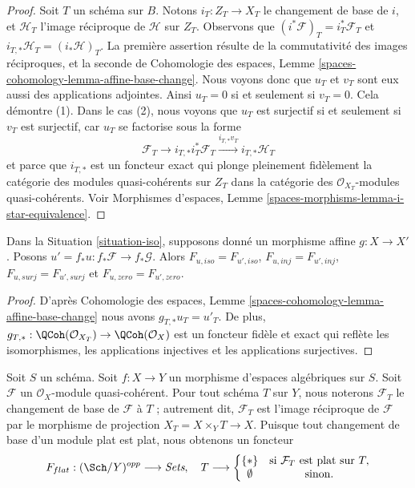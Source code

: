 \begin{proof}
Soit $T$ un schéma sur $B$. Notons $i_T : Z_T \to X_T$
le changement de base de $i$, et $\mathcal{H}_T$ l'image réciproque de $\mathcal{H}$
sur $Z_T$. Observons que $(i^*\mathcal{F})_T = i_T^*\mathcal{F}_T$
et $i_{T, *}\mathcal{H}_T = (i_*\mathcal{H})_T$.
La première assertion résulte de la commutativité des images réciproques,
et la seconde de Cohomologie des espaces, Lemme
\ref{spaces-cohomology-lemma-affine-base-change}.
Nous voyons donc que $u_T$ et $v_T$ sont eux aussi des applications adjointes.
Ainsi $u_T = 0$ si et seulement si $v_T = 0$. Cela démontre (1).
Dans le cas (2), nous voyons que $u_T$ est surjectif si et seulement si
$v_T$ est surjectif, car $u_T$ se factorise sous la forme
$$
\mathcal{F}_T \to
i_{T, *}i_T^*\mathcal{F}_T \xrightarrow{i_{T, *}v_T} i_{T, *}\mathcal{H}_T
$$
et parce que $i_{T, *}$ est un foncteur exact
qui plonge pleinement fidèlement la catégorie des modules quasi-cohérents sur
$Z_T$ dans la catégorie des $\mathcal{O}_{X_T}$-modules quasi-cohérents.
Voir Morphismes d'espaces, Lemme \ref{spaces-morphisms-lemma-i-star-equivalence}.
\end{proof}

\begin{lemma}
\label{lemma-relate-zero-affine-push}
Dans la Situation \ref{situation-iso}, supposons donné un morphisme affine
$g : X \to X'$. Posons $u' = f_*u : f_*\mathcal{F} \to f_*\mathcal{G}$.
Alors $F_{u, iso} = F_{u', iso}$, $F_{u, inj} = F_{u', inj}$,
$F_{u, surj} = F_{u', surj}$ et $F_{u, zero} = F_{u', zero}$.
\end{lemma}

\begin{proof}
D'après Cohomologie des espaces, Lemme
\ref{spaces-cohomology-lemma-affine-base-change}
nous avons $g_{T, *}u_T = u'_T$.
De plus, $g_{T, *} : \QCoh(\mathcal{O}_{X_T}) \to \QCoh(\mathcal{O}_X)$
est un foncteur fidèle et exact qui reflète les isomorphismes, les applications
injectives et les applications surjectives.
\end{proof}

\begin{situation}
\label{situation-flat}
Soit $S$ un schéma.
Soit $f : X \to Y$ un morphisme d'espaces algébriques sur $S$.
Soit $\mathcal{F}$ un $\mathcal{O}_X$-module quasi-cohérent.
Pour tout schéma $T$ sur $Y$, nous noterons $\mathcal{F}_T$ le
changement de base de $\mathcal{F}$ à $T$ ; autrement dit, $\mathcal{F}_T$
est l'image réciproque de $\mathcal{F}$ par le morphisme de projection
$X_T = X \times_Y T \to X$. Puisque tout changement de base d'un module plat
est plat, nous obtenons un foncteur
\begin{equation}
\label{equation-flat}
F_{flat} : (\Sch/Y)^{opp} \longrightarrow \textit{Sets}, \quad
T \longrightarrow \left\{
\begin{matrix}
\{*\} & \text{si } \mathcal{F}_T \text{ est plat sur }T, \\
\emptyset & \text{sinon.}
\end{matrix}
\right.
\end{equation}
\end{situation}

